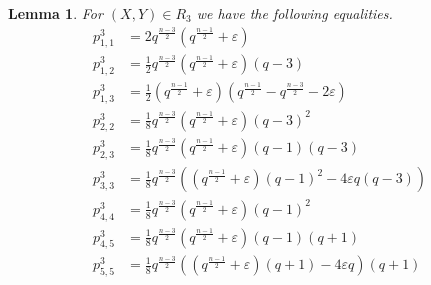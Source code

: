 \documentclass[a4paper]{article}
\newtheorem{lm}[thm]{Lemma}
\theoremstyle{definition}
\newcommand{\eps}{\varepsilon}
\begin{document}
\begin{lm}
 \label{lem:R3relations}
    For $(X,Y)\in R_{3}$ we have the following equalities.
    {\allowdisplaybreaks \begin{align*}
        p^{3}_{1,1}&=2q^{\frac{n-3}{2}}\left(q^{\frac{n-1}{2}}+\eps \right)\\
        p^{3}_{1,2}&=\frac{1}{2}q^{\frac{n-3}{2}}\left(q^{\frac{n-1}{2}}+\eps \right)\left(q-3\right)\\
        p^{3}_{1,3}&=\frac{1}{2}\left(q^{\frac{n-1}{2}}+\eps\right)\left(q^{\frac{n-1}{2}}-q^{\frac{n-3}{2}}-2\eps\right)\\
        p^{3}_{2,2}&=\frac{1}{8}q^{\frac{n-3}{2}}\left(q^{\frac{n-1}{2}}+\eps\right)\left(q-3\right)^{2}\\
        p^{3}_{2,3}&=\frac{1}{8}q^{\frac{n-3}{2}}\left(q^{\frac{n-1}{2}}+\eps \right)\left(q-1\right)\left(q-3\right)\\
        p^{3}_{3,3} &= \frac{1}{8}q^{\frac{n-3}{2}}\left( \left(q^{\frac{n-1}{2}}+\eps\right)(q-1)^{2}-4\eps q(q-3) \right)\\
        p^{3}_{4,4}&=\frac{1}{8}q^{\frac{n-3}{2}}\left(q^{\frac{n-1}{2}}+\eps \right)\left(q-1\right)^2\\
        p^{3}_{4,5}&=\frac{1}{8}q^{\frac{n-3}{2}}\left(q^{\frac{n-1}{2}}+\eps \right)\left(q-1\right)(q+1)\\
        p^{3}_{5,5} &= \frac{1}{8}q^{\frac{n-3}{2}}\left( \left(q^{\frac{n-1}{2}}+\eps\right)(q+1)-4\eps q \right)\left(q+1\right)
    \end{align*}}
\end{lm}
\end{document}
